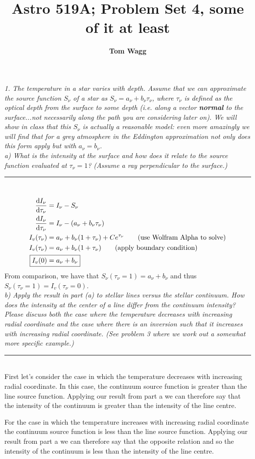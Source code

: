 \documentclass[12pt, letterpaper, twoside]{article}
\title{Astro 519A; Problem Set 4, some of it at least}
\author{\textbf{Tom Wagg}}
\newcommand{\answer}[1]{
    \par\noindent\rule{\textwidth}{0.4pt}\\#1\\
}
\begin{document}
\maketitle

{\it 1.  The temperature in a star varies with depth.   Assume that we can approximate the source function $S_\nu$ of a star as $S_\nu = a_\nu +b_\nu \tau_\nu$, where $\tau_\nu$ is defined as the optical depth from the surface to some depth (i.e. along a vector {\bf normal} to the surface...not necessarily along the path you are considering later on). We will show in class that this $S_\nu$ is actually a reasonable model: even more amazingly we will find that  for a grey atmosphere in the Eddington approximation not only does this form apply but with $a_\nu =b_\nu$.\\ 
a) What is the intensity at the surface and how does it relate to the source function evaluated at $\tau_\nu = 1$?  (Assume a ray perpendicular to the surface.)}

\answer{
    \begin{align}
        \dv{I_\nu}{\tau_\nu} &= I_\nu - S_\nu \\
        \dv{I_\nu}{\tau_\nu} &= I_\nu - (a_\nu + b_\nu \tau_\nu) \\
        I_v(\tau_\nu) &= a_\nu + b_\nu (1 + \tau_\nu) + C e^{\tau_\nu} \tag{use Wolfram Alpha to solve} \\
        I_v(\tau_\nu) &= a_\nu + b_\nu (1 + \tau_\nu) \tag{apply boundary condition} \\
        \Aboxed{ I_v(0) &= a_\nu + b_\nu }
    \end{align}
    From comparison, we have that $S_{\nu}(\tau_\nu = 1) = a_\nu + b_\nu$ and thus $S_{\nu}(\tau_\nu = 1) = I_v(\tau_\nu = 0)$.
}

{\it b) Apply the result in part (a) to stellar lines versus the stellar continuum.  How does the intensity at the center of a line differ from the continuum intensity? Please discuss both the case where the temperature decreases with increasing radial coordinate and the case where there is an inversion such that it increases with increasing radial coordinate.  (See problem 3 where we work out a somewhat more specific example.)}

\answer{
    First let's consider the case in which the temperature decreases with increasing radial coordinate. In this case, the continuum source function is greater than the line source function. Applying our result from part a we can therefore say that the intensity of the continuum is greater than the intensity of the line centre.
    
    For the case in which the temperature increases with increasing radial coordinate the continuum source function is less than the line source function. Applying our result from part a we can therefore say that the opposite relation and so the intensity of the continuum is less than the intensity of the line centre.
}
\end{document}
